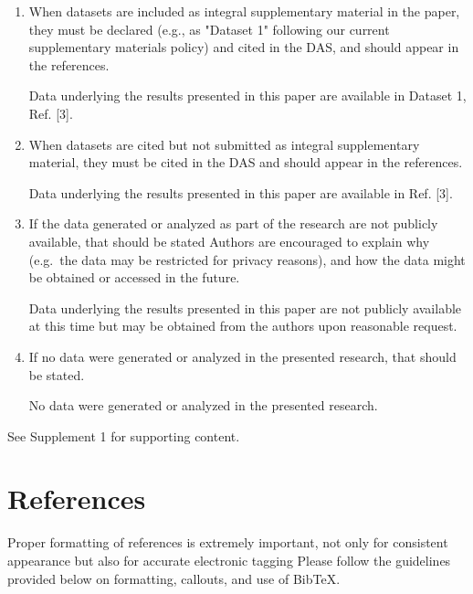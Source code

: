 \documentclass{osa-article}
\begin{document}
\begin{backmatter}
\begin{enumerate}
\item When datasets are included as integral supplementary material in the paper, they must be declared (e.g., as "Dataset 1" following our current supplementary materials policy) and cited in the DAS, and should appear in the references.

 Data underlying the results presented in this paper are available in Dataset 1, Ref. [3].

\bigskip

\item When datasets are cited but not submitted as integral supplementary material, they must be cited in the DAS and should appear in the references.

 Data underlying the results presented in this paper are available in Ref. [3].

\bigskip

\item If the data generated or analyzed as part of the research are not publicly available, that should be stated
Authors are encouraged to explain why (e.g.~the data may be restricted for privacy reasons), and how the data might be obtained or accessed in the future.

 Data underlying the results presented in this paper are not publicly available at this time but may be obtained from the authors upon reasonable request.

\bigskip

\item If no data were generated or analyzed in the presented research, that should be stated.

 No data were generated or analyzed in the presented research.
\end{enumerate}


See Supplement 1 for supporting content.

\end{backmatter}

\section{References}
\label{sec:refs}
Proper formatting of references is extremely important, not only for consistent appearance but also for accurate electronic tagging
Please follow the guidelines provided below on formatting, callouts, and use of Bib\TeX.
\end{document}
